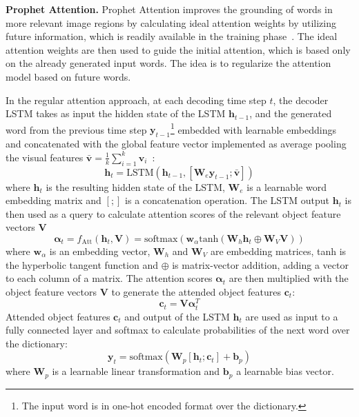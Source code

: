 \documentclass[english,twoside,openright]{HYgraduMLDS}
\newcommand{\matr}[1]{\bm{#1}}
\newcommand{\vect}[1]{\bm{#1}}
\begin{document}
\textbf{Prophet Attention.} Prophet Attention improves the grounding of words in more relevant image regions by calculating ideal attention weights by utilizing future information, which is readily available in the training phase~\cite{Prophet}. The ideal attention weights are then used
to guide the initial attention, which is based only on the already generated input words. The idea is to regularize the attention model based on future words.

In the regular attention approach, at each decoding time step $t$, the decoder LSTM takes as input the hidden state of the LSTM $\vect{h}_{t-1}$, and the generated word from the previous time step $\vect{y}_{t-1}$\footnote{The input word is in one-hot encoded format over the dictionary.} embedded with learnable embeddings and concatenated with the global feature vector implemented as average pooling the visual features $\bar{\vect{v}} = \frac{1}{k} \sum_{i=1}^k \vect{v}_i$~\cite{Prophet}:
\begin{equation}
\vect{h}_{t} = \text{LSTM}(\vect{h}_{t-1}, [\matr{W}_e \vect{y}_{t-1}; \bar{\vect{v}}])
\end{equation}
%
where $\vect{h}_{t}$ is the resulting hidden state of the LSTM,  $\matr{W}_e$ is a learnable word embedding matrix and $[;]$ is a concatenation operation. The LSTM output $\vect{h}_t$ is then used as a query to calculate attention scores of the relevant object feature vectors $\matr{V}$ 
\begin{equation}
\vect{\alpha}_t = f_{\text{Att}}(\vect{h}_t,\matr{V}) = \text{softmax}(\vect{w}_{\alpha} \text{tanh}(\matr{W}_h \vect{h}_t \oplus \matr{W}_V \matr{V}))
\end{equation}
%
where $\vect{w}_{\alpha}$ is an embedding vector, $\matr{W}_h$ and $\matr{W}_V$ are embedding matrices, tanh is the hyperbolic tangent function and $\oplus$ is matrix-vector addition, adding a vector to each column of a matrix. The attention scores $\vect{\alpha}_t$ are then multiplied with the object feature vectors $\matr{V}$ to generate the attended object features $\vect{c}_t$:
\begin{equation}
\vect{c}_t = \matr{V} \vect{\alpha}_t^T
\end{equation}
%
Attended object features $\vect{c}_t$ and output of the LSTM $\vect{h}_t$ are used as input to a fully connected layer and softmax to calculate probabilities of the next word over the dictionary:
\begin{equation}
\vect{y}_t = \text{softmax}(\matr{W}_p [\vect{h}_t ; \vect{c}_t] + \vect{b}_p)
\end{equation}
%
where $\matr{W}_p$ is a learnable linear transformation and $\vect{b}_p$ a learnable bias vector.
 
\end{document}
